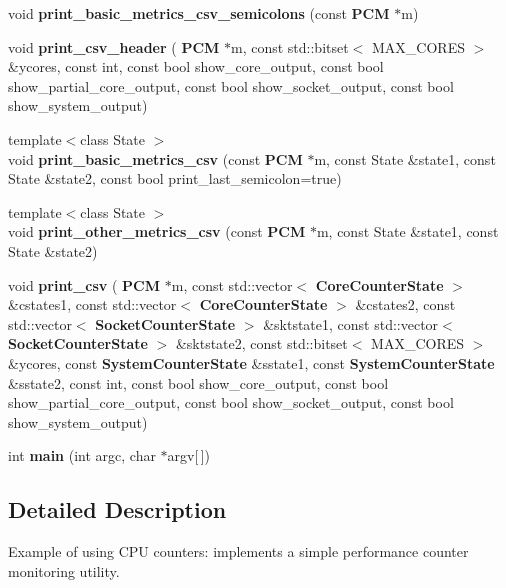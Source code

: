 \begin{DoxyCompactItemize}
\item 
\mbox{\label{pcm_8cpp_a9d07d90bb2ddedc67ca509a36532aa9f}} 
void {\bfseries print\+\_\+basic\+\_\+metrics\+\_\+csv\+\_\+semicolons} (const \textbf{ P\+CM} $\ast$m)
\item 
\mbox{\label{pcm_8cpp_ab8edf48a6781e03c80be36484dc4b3e7}} 
void {\bfseries print\+\_\+csv\+\_\+header} (\textbf{ P\+CM} $\ast$m, const std\+::bitset$<$ M\+A\+X\+\_\+\+C\+O\+R\+ES $>$ \&ycores, const int, const bool show\+\_\+core\+\_\+output, const bool show\+\_\+partial\+\_\+core\+\_\+output, const bool show\+\_\+socket\+\_\+output, const bool show\+\_\+system\+\_\+output)
\item 
\mbox{\label{pcm_8cpp_a85ee4b0f33d06783d58aad6e632a874c}} 
{\footnotesize template$<$class State $>$ }\\void {\bfseries print\+\_\+basic\+\_\+metrics\+\_\+csv} (const \textbf{ P\+CM} $\ast$m, const State \&state1, const State \&state2, const bool print\+\_\+last\+\_\+semicolon=true)
\item 
\mbox{\label{pcm_8cpp_abbee0b7c7fe76bdd2bebfe112318fbed}} 
{\footnotesize template$<$class State $>$ }\\void {\bfseries print\+\_\+other\+\_\+metrics\+\_\+csv} (const \textbf{ P\+CM} $\ast$m, const State \&state1, const State \&state2)
\item 
\mbox{\label{pcm_8cpp_a55e478c8be8eefaad2fa6e87982c9ce9}} 
void {\bfseries print\+\_\+csv} (\textbf{ P\+CM} $\ast$m, const std\+::vector$<$ \textbf{ Core\+Counter\+State} $>$ \&cstates1, const std\+::vector$<$ \textbf{ Core\+Counter\+State} $>$ \&cstates2, const std\+::vector$<$ \textbf{ Socket\+Counter\+State} $>$ \&sktstate1, const std\+::vector$<$ \textbf{ Socket\+Counter\+State} $>$ \&sktstate2, const std\+::bitset$<$ M\+A\+X\+\_\+\+C\+O\+R\+ES $>$ \&ycores, const \textbf{ System\+Counter\+State} \&sstate1, const \textbf{ System\+Counter\+State} \&sstate2, const int, const bool show\+\_\+core\+\_\+output, const bool show\+\_\+partial\+\_\+core\+\_\+output, const bool show\+\_\+socket\+\_\+output, const bool show\+\_\+system\+\_\+output)
\item 
\mbox{\label{pcm_8cpp_a0ddf1224851353fc92bfbff6f499fa97}} 
int {\bfseries main} (int argc, char $\ast$argv[$\,$])
\end{DoxyCompactItemize}


\subsection{Detailed Description}
Example of using C\+PU counters\+: implements a simple performance counter monitoring utility. 

